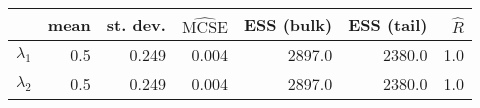 \begin{tabular}{lrrrrrr}
\toprule
{} &  mean &  st. dev. &  $\widehat{\mathrm{MCSE}}$ &  ESS (bulk) &  ESS (tail) &  $\widehat{R}$ \\
\midrule
$\lambda_1$ &   0.5 &     0.249 &                      0.004 &      2897.0 &      2380.0 &            1.0 \\
$\lambda_2$ &   0.5 &     0.249 &                      0.004 &      2897.0 &      2380.0 &            1.0 \\
\bottomrule
\end{tabular}
